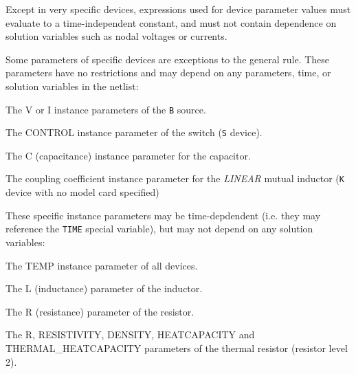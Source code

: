 Except in very specific devices, expressions used for device parameter
values must evaluate to a time-independent constant, and must not
contain dependence on solution variables such as nodal voltages or
currents.  

\begin{centering}
\end{centering}

Some parameters of specific devices are exceptions to the general
rule.  These parameters have no restrictions and may depend on any
parameters, time, or solution variables in the
netlist:
\begin{XyceItemize}
\item The \textrm{V} or \textrm{I} instance parameters of the
  \texttt{B} source.
\item The \textrm{CONTROL} instance parameter of the switch (\texttt{S}
  device).
\item The \textrm{C} (capacitance) instance parameter for the capacitor.
\item The coupling coefficient instance parameter for the {\em LINEAR}
  mutual inductor (\texttt{K} device with no model card specified)
\end{XyceItemize}

These specific instance parameters may be time-depdendent (i.e. they
may reference the \texttt{TIME} special variable), but may not depend
on any solution variables:

\begin{XyceItemize}
\item The \textrm{TEMP} instance parameter of all devices.
\item The \textrm{L} (inductance) parameter of the inductor.
\item The \textrm{R} (resistance) parameter of the resistor.
\item The \textrm{R}, \textrm{RESISTIVITY}, \textrm{DENSITY}, \textrm{HEATCAPACITY} and \textrm{THERMAL\_HEATCAPACITY} parameters of the thermal resistor (resistor level 2).
\end{XyceItemize}

